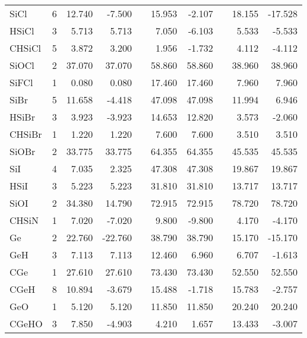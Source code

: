 \begin{table}
\begin{center}
\begin{tabular}{lrrrrrrrrr}
      SiCl    &      6 &   12.740 &   -7.500 &  &   15.953 &   -2.107 &  &   18.155 &  -17.528 \\
      HSiCl   &      3 &    5.713 &    5.713 &  &    7.050 &   -6.103 &  &    5.533 &   -5.533 \\
      CHSiCl  &      5 &    3.872 &    3.200 &  &    1.956 &   -1.732 &  &    4.112 &   -4.112 \\
      SiOCl   &      2 &   37.070 &   37.070 &  &   58.860 &   58.860 &  &   38.960 &   38.960 \\
      SiFCl   &      1 &    0.080 &    0.080 &  &   17.460 &   17.460 &  &    7.960 &    7.960 \\
      SiBr    &      5 &   11.658 &   -4.418 &  &   47.098 &   47.098 &  &   11.994 &    6.946 \\
      HSiBr   &      3 &    3.923 &   -3.923 &  &   14.653 &   12.820 &  &    3.573 &   -2.060 \\
      CHSiBr  &      1 &    1.220 &    1.220 &  &    7.600 &    7.600 &  &    3.510 &    3.510 \\
      SiOBr   &      2 &   33.775 &   33.775 &  &   64.355 &   64.355 &  &   45.535 &   45.535 \\
      SiI     &      4 &    7.035 &    2.325 &  &   47.308 &   47.308 &  &   19.867 &   19.867 \\
      HSiI    &      3 &    5.223 &    5.223 &  &   31.810 &   31.810 &  &   13.717 &   13.717 \\
      SiOI    &      2 &   34.380 &   14.790 &  &   72.915 &   72.915 &  &   78.720 &   78.720 \\
      CHSiN   &      1 &    7.020 &   -7.020 &  &    9.800 &   -9.800 &  &    4.170 &   -4.170 \\
      Ge      &      2 &   22.760 &  -22.760 &  &   38.790 &   38.790 &  &   15.170 &  -15.170 \\
      GeH     &      3 &    7.113 &    7.113 &  &   12.460 &    6.960 &  &    6.707 &   -1.613 \\
      CGe     &      1 &   27.610 &   27.610 &  &   73.430 &   73.430 &  &   52.550 &   52.550 \\
      CGeH    &      8 &   10.894 &   -3.679 &  &   15.488 &   -1.718 &  &   15.783 &   -2.757 \\
      GeO     &      1 &    5.120 &    5.120 &  &   11.850 &   11.850 &  &   20.240 &   20.240 \\
      CGeHO   &      3 &    7.850 &   -4.903 &  &    4.210 &    1.657 &  &   13.433 &   -3.007 \\

\end{tabular}
\end{center}
\end{table}
